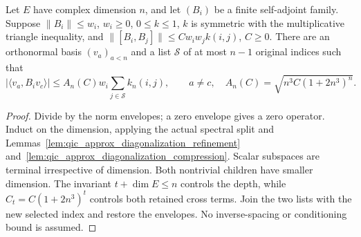 \begin{theorem}
    \label{thm:qic_approx_diagonalization_uniform_basis}
    \leanok

    \leanok

    Let $E$ have complex dimension $n$, and let $(B_i)$ be a finite
    self-adjoint family. Suppose $\|B_i\|\le w_i$, $w_i\ge0$,
    $0\le k\le1$, $k$ is symmetric with the multiplicative triangle
    inequality, and $\|[B_i,B_j]\|\le Cw_iw_jk(i,j)$, $C\ge0$.
    There are an orthonormal basis $(v_a)_{a<n}$ and a list
    $\mathcal S$ of at most $n-1$ original indices such that
    \[
       |\langle v_a,B_i v_c\rangle|
       \le A_n(C)w_i\sum_{j\in\mathcal S}k_n(i,j),\qquad a\ne c,
       \quad A_n(C)=\sqrt{n^3C(1+2n^3)^n}.
    \]
\end{theorem}
\begin{proof}\leanok
    Divide by the norm envelopes; a zero envelope gives a zero operator.
    Induct on the dimension, applying the actual spectral split and
    Lemmas~\ref{lem:qic_approx_diagonalization_refinement}
    and~\ref{lem:qic_approx_diagonalization_compression}.
    Scalar subspaces are terminal irrespective of dimension.
    Both nontrivial children have smaller dimension. The invariant
    $t+\dim E\le n$ controls the depth, while
    $C_t=C(1+2n^3)^t$ controls both retained cross terms.
    Join the two lists with the new selected index and restore the
    envelopes. No inverse-spacing or conditioning bound is assumed.
\end{proof}
